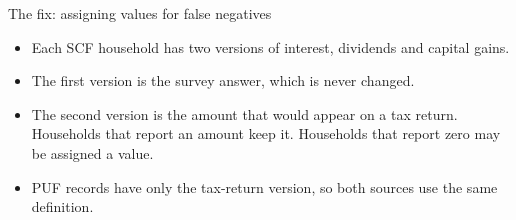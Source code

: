 \documentclass[11pt,aspectratio=169]{beamer}
\begin{document}
\begin{frame}{The fix: assigning values for false negatives}
  \centering

  \vspace{0.4em}
  \raggedright
  \small
  \begin{itemize}
    \item Each SCF household has two versions of interest, dividends and capital gains.
    \item The first version is the survey answer, which is never changed.
    \item The second version is the amount that would appear on a tax return.
          Households that report an amount keep it. Households that report zero may be assigned a value.
    \item PUF records have only the tax-return version, so both sources use the same definition.
  \end{itemize}
\end{frame}
\end{document}
